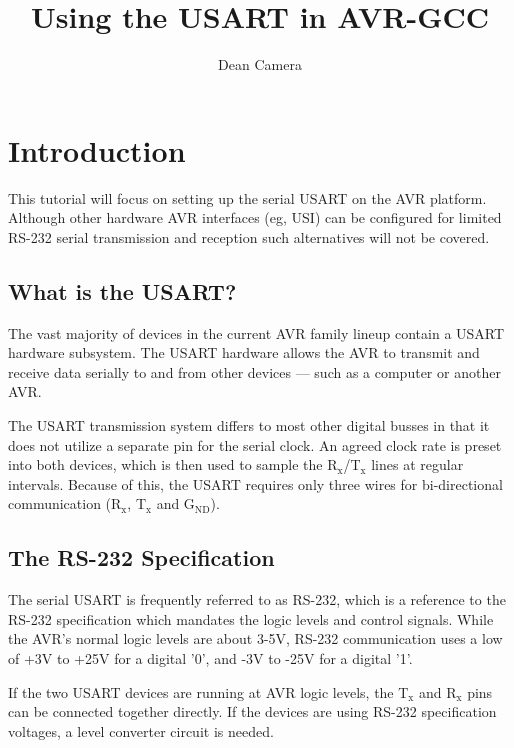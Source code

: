 \documentclass[a4paper,oneside]{book}
\newcommand{\subscript}[1]{\ensuremath{_{\textrm{#1}}}}
\begin{document}
\title{Using the USART in AVR-GCC}
\author{Dean Camera}
\maketitle



\cleardoublepage
\tableofcontents
\cleardoublepage


\chapter{Introduction}

This tutorial will focus on setting up the serial USART on the AVR platform. Although other hardware AVR interfaces (eg, USI) can be configured for limited RS-232 serial transmission and reception such alternatives will not be covered.

\section{What is the USART?}

The vast majority of devices in the current AVR family lineup contain a USART hardware subsystem. The USART hardware allows the AVR to transmit and receive data serially to and from other devices --- such as a computer or another AVR.

The USART transmission system differs to most other digital busses in that it does not utilize a separate pin for the serial clock. An agreed clock rate is preset into both devices, which is then used to sample the R\subscript{x}/T\subscript{x} lines at regular intervals. Because of this, the USART requires only three wires for bi-directional communication (R\subscript{x}, T\subscript{x} and G\subscript{ND}).

\section{The RS-232 Specification}

The serial USART is frequently referred to as RS-232, which is a reference to the RS-232 specification which mandates the logic levels and control signals. While the AVR's normal logic levels are about 3-5V, RS-232 communication uses a low of +3V to +25V for a digital '0', and -3V to -25V for a digital '1'.

If the two USART devices are running at AVR logic levels, the T\subscript{x} and R\subscript{x} pins can be connected together directly. If the devices are using RS-232 specification voltages, a level converter circuit is needed.
\end{document}
